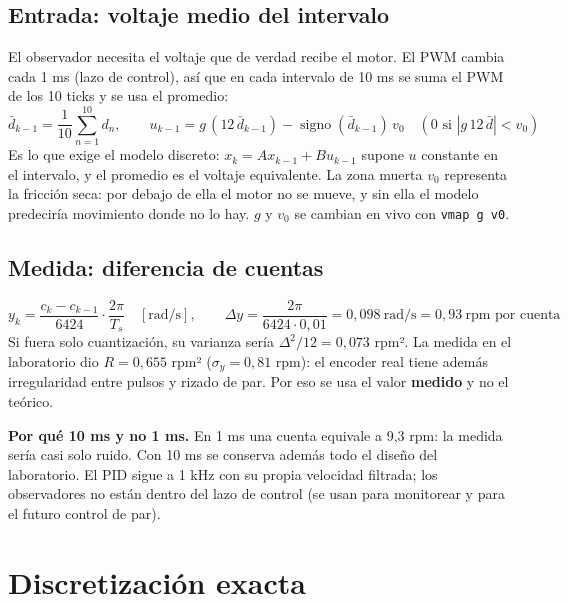 \documentclass[11pt]{article}
\newcommand{\cod}[1]{\texttt{#1}}
\begin{document}
\subsection*{Entrada: voltaje medio del intervalo}
El observador necesita el voltaje que de verdad recibe el motor. El PWM cambia cada 1 ms (lazo de control), así que en cada intervalo de 10 ms se suma el PWM de los 10 ticks y se usa el promedio:
\begin{equation}
\bar d_{k-1}=\frac{1}{10}\sum_{n=1}^{10} d_n,\qquad u_{k-1}=g\,(12\,\bar d_{k-1})-\operatorname{signo}(\bar d_{k-1})\,v_0\quad(0 \text{ si }|g\,12\,\bar d|<v_0)
\end{equation}
Es lo que exige el modelo discreto: $x_k=Ax_{k-1}+Bu_{k-1}$ supone $u$ constante en el intervalo, y el promedio es el voltaje equivalente. La zona muerta $v_0$ representa la fricción seca: por debajo de ella el motor no se mueve, y sin ella el modelo predeciría movimiento donde no lo hay. $g$ y $v_0$ se cambian en vivo con \cod{vmap g v0}.

\subsection*{Medida: diferencia de cuentas}
\begin{equation}
y_k=\frac{c_k-c_{k-1}}{6424}\cdot\frac{2\pi}{T_s}\quad[\text{rad/s}],\qquad \Delta y=\frac{2\pi}{6424\cdot0{,}01}=0{,}098\ \text{rad/s}=0{,}93\ \text{rpm por cuenta}
\end{equation}
Si fuera solo cuantización, su varianza sería $\Delta^2/12=0{,}073$ rpm². La medida en el laboratorio dio $R=0{,}655$ rpm² ($\sigma_y=0{,}81$ rpm): el encoder real tiene además irregularidad entre pulsos y rizado de par. Por eso se usa el valor \textbf{medido} y no el teórico.

\textbf{Por qué 10 ms y no 1 ms.} En 1 ms una cuenta equivale a 9,3 rpm: la medida sería casi solo ruido. Con 10 ms se conserva además todo el diseño del laboratorio. El PID sigue a 1 kHz con su propia velocidad filtrada; los observadores no están dentro del lazo de control (se usan para monitorear y para el futuro control de par).

\section{Discretización exacta}
\end{document}
